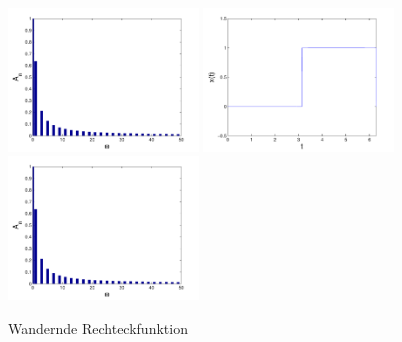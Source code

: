 \begin{refsection}
\begin{figure}
\includegraphics[width=0.45\textwidth]{kugel/kSpektrum/Rechteck3_2.pdf}
\includegraphics[width=0.45\textwidth]{kugel/kSpektrum/Rechteck4_1.pdf}
\includegraphics[width=0.45\textwidth]{kugel/kSpektrum/Rechteck4_2.pdf}
\caption{Wandernde Rechteckfunktion
\label{skript:Spektrum1}}
\end{figure}


\end{refsection}
